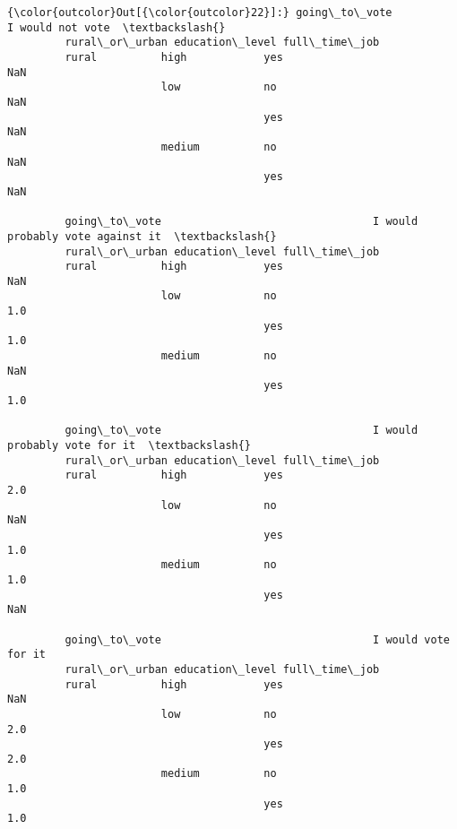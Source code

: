 \documentclass[11pt]{article}
\begin{document}
\begin{Verbatim}[commandchars=\\\{\}]
{\color{outcolor}Out[{\color{outcolor}22}]:} going\_to\_vote                                 I would not vote  \textbackslash{}
         rural\_or\_urban education\_level full\_time\_job                     
         rural          high            yes                         NaN   
                        low             no                          NaN   
                                        yes                         NaN   
                        medium          no                          NaN   
                                        yes                         NaN   
         
         going\_to\_vote                                 I would probably vote against it  \textbackslash{}
         rural\_or\_urban education\_level full\_time\_job                                     
         rural          high            yes                                         NaN   
                        low             no                                          1.0   
                                        yes                                         1.0   
                        medium          no                                          NaN   
                                        yes                                         1.0   
         
         going\_to\_vote                                 I would probably vote for it  \textbackslash{}
         rural\_or\_urban education\_level full\_time\_job                                 
         rural          high            yes                                     2.0   
                        low             no                                      NaN   
                                        yes                                     1.0   
                        medium          no                                      1.0   
                                        yes                                     NaN   
         
         going\_to\_vote                                 I would vote for it  
         rural\_or\_urban education\_level full\_time\_job                       
         rural          high            yes                            NaN  
                        low             no                             2.0  
                                        yes                            2.0  
                        medium          no                             1.0  
                                        yes                            1.0  
\end{Verbatim}
            
\end{document}
